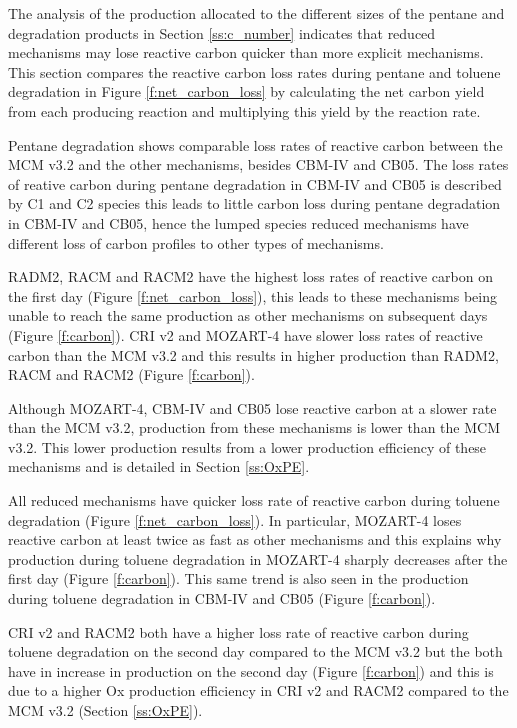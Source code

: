 The analysis of the  production allocated to the different sizes of the pentane and degradation products in Section \ref{ss:c_number} indicates that reduced mechanisms may lose reactive carbon quicker than more explicit mechanisms.
This section compares the reactive carbon loss rates during pentane and toluene degradation in Figure \ref{f:net_carbon_loss} by calculating the net carbon yield from each  producing reaction and multiplying this yield by the reaction rate.

Pentane degradation shows comparable loss rates of reactive carbon between the MCM v3.2 and the other mechanisms, besides CBM-IV and CB05.
The loss rates of reative carbon during pentane degradation in CBM-IV and CB05 is described by C1 and C2 species this leads to little carbon loss during pentane degradation in CBM-IV and CB05, hence the lumped species reduced mechanisms have different loss of carbon profiles to other types of mechanisms.

RADM2, RACM and RACM2 have the highest loss rates of reactive carbon on the first day (Figure \ref{f:net_carbon_loss}), this leads to these mechanisms being unable to reach the same  production as other mechanisms on subsequent days (Figure \ref{f:carbon}).
CRI v2 and MOZART-4 have slower loss rates of reactive carbon than the MCM v3.2 and this results in higher  production than RADM2, RACM and RACM2 (Figure \ref{f:carbon}).

Although MOZART-4, CBM-IV and CB05 lose reactive carbon at a slower rate than the MCM v3.2,  production from these mechanisms is lower than the MCM v3.2.
This lower  production results from a lower  production efficiency of these mechanisms and is detailed in Section \ref{ss:OxPE}.

All reduced mechanisms have quicker loss rate of reactive carbon during toluene degradation (Figure \ref{f:net_carbon_loss}).
In particular, MOZART-4 loses reactive carbon at least twice as fast as other mechanisms and this explains why  production during toluene degradation in MOZART-4 sharply decreases after the first day (Figure \ref{f:carbon}).
This same trend is also seen in the  production during toluene degradation in CBM-IV and CB05 (Figure \ref{f:carbon}).

CRI v2 and RACM2 both have a higher loss rate of reactive carbon during toluene degradation on the second day compared to the MCM v3.2 but the both have in increase in  production on the second day (Figure \ref{f:carbon}) and this is due to a higher Ox production efficiency in CRI v2 and RACM2 compared to the MCM v3.2 (Section \ref{ss:OxPE}).

